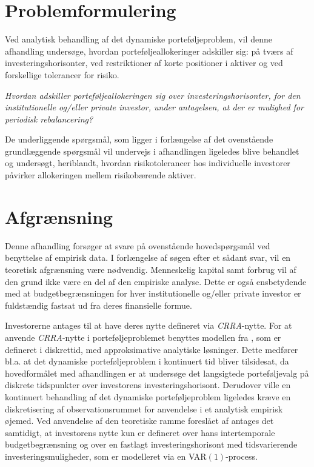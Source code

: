 \documentclass[
  a4paper,
  oneside]{memoir}
\begin{document}
\hypertarget{problemformulering}{%
\section{Problemformulering}\label{problemformulering}}

Ved analytisk behandling af det dynamiske porteføljeproblem, vil denne afhandling undersøge, hvordan porteføljeallokeringer adskiller sig: på tværs af investeringshorisonter, ved restriktioner af korte positioner i aktiver og ved forskellige tolerancer for risiko.

\begin{center}
\textit{Hvordan adskiller porteføljeallokeringen sig over investeringshorisonter, for den institutionelle og/eller private investor, under antagelsen, at der er mulighed for periodisk rebalancering?}
\end{center}

De underliggende spørgsmål, som ligger i forlængelse af det ovenstående grundlæggende spørgsmål vil undervejs i afhandlingen ligeledes blive behandlet og undersøgt, heriblandt, hvordan risikotolerancer hos individuelle investorer påvirker allokeringen mellem risikobærende aktiver.

\hypertarget{afgruxe6nsning}{%
\section{Afgrænsning}\label{afgruxe6nsning}}

Denne afhandling forsøger at svare på ovenstående hovedspørgsmål ved benyttelse af empirisk data. I forlængelse af søgen efter et sådant svar, vil en teoretisk afgrænsning være nødvendig. Menneskelig kapital samt forbrug vil af den grund ikke være en del af den empiriske analyse. Dette er også ensbetydende med at budgetbegrænsningen for hver institutionelle og/eller private investor er fuldstændig fastsat ud fra deres finansielle formue.

Investorerne antages til at have deres nytte defineret via \emph{CRRA}-nytte. For at anvende \emph{CRRA}-nytte i porteføljeproblemet benyttes modellen fra \citep{JurVic2011}, som er defineret i diskrettid, med approksimative analytiske løsninger. Dette medfører bl.a. at det dynamiske porteføljeproblem i kontinuert tid bliver tilsidesat, da hovedformålet med afhandlingen er at undersøge det langsigtede porteføljevalg på diskrete tidspunkter over investorens investeringshorisont. Derudover ville en kontinuert behandling af det dynamiske porteføljeproblem ligeledes kræve en diskretisering af observationsrummet for anvendelse i et analytisk empirisk øjemed. Ved anvendelse af den teoretiske ramme foreslået af \citep{JurVic2011} antages det samtidigt, at investorens nytte kun er defineret over hans intertemporale budgetbegrænsning og over en fastlagt investeringshorisont med tidsvarierende investeringsmuligheder, som er modelleret via en VAR\((1)\)-process.
\end{document}
